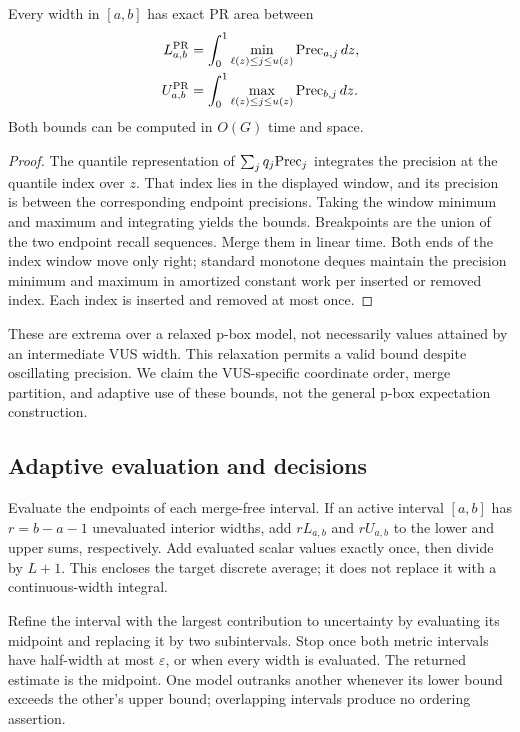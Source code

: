 \begin{theorem}
Every width in $[a,\allowbreak b]$ has exact PR area between
\begin{align}
 L_{a,b}^{\mathrm{PR}}
 &=\int_0^1\min_{\ell(z)\le j\le u(z)}\mathrm{Prec}_{a,j}\,dz,\\
 U_{a,b}^{\mathrm{PR}}
 &=\int_0^1\max_{\ell(z)\le j\le u(z)}\mathrm{Prec}_{b,j}\,dz .
\end{align}
Both bounds can be computed in $O(G)$ time and space.
\end{theorem}
\begin{proof}
The quantile representation of $\sum_jq_j\mathrm{Prec}_j$ integrates the precision
at the quantile index over $z$. That index lies in the displayed window,
and its precision is between the corresponding endpoint precisions.
Taking the window minimum and maximum and integrating yields the bounds.
Breakpoints are the union of the two endpoint recall sequences. Merge them
in linear time. Both ends of the index window move only right; standard
monotone deques maintain the precision minimum and maximum in amortized
constant work per inserted or removed index. Each index is inserted and
removed at most once.
\end{proof}
These are extrema over a relaxed p-box model, not necessarily values
attained by an intermediate VUS width. This relaxation permits a valid bound
despite oscillating precision. We claim the VUS-specific coordinate order,
merge partition, and adaptive use of these bounds, not the general p-box
expectation construction.

\subsection{Adaptive evaluation and decisions}
Evaluate the endpoints of each merge-free interval. If an active interval
$[a,\allowbreak b]$ has $r=b-a-1$ unevaluated interior widths, add $rL_{a,\allowbreak b}$ and
$rU_{a,\allowbreak b}$ to the lower and upper sums, respectively. Add evaluated scalar
values exactly once, then divide by $L+1$. This encloses the target discrete
average; it does not replace it with a continuous-width integral.

Refine the interval with the largest contribution to uncertainty by
evaluating its midpoint and replacing it by two subintervals.
Stop once both metric intervals have half-width at most $\varepsilon$,
or when every width is evaluated. The returned estimate is the midpoint.
One model outranks another whenever its lower bound exceeds the other's
upper bound; overlapping intervals produce no ordering assertion.

